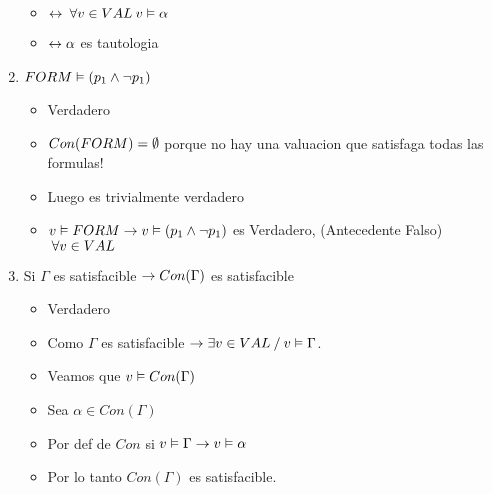 \documentclass[14pt,a4paper,fleqn]{article}
\begin{document}
\begin{enumerate}
\begin{itemize}
		\item $\leftrightarrow \: \forall v \in VAL  \: v \vDash \alpha$
		\item $\leftrightarrow \alpha $ es tautologia
	\end{itemize}
	\item $ FORM \vDash (p_{1} \wedge \neg p_{1})$
	\begin{itemize}
		\item Verdadero
		\item $Con(FORM) = \emptyset $ porque no hay una valuacion que satisfaga todas las formulas!
		\item Luego es trivialmente verdadero
		\item $v \vDash FORM \rightarrow v \vDash (p_1 \wedge \neg p_1) $ es Verdadero, (Antecedente Falso) $\: \forall v \in VAL $
	\end{itemize}
	\item Si $\Gamma$ es satisfacible $\rightarrow Con(\Gamma)$ es satisfacible
	\begin{itemize}
		\item Verdadero
		\item Como $\Gamma$ es satisfacible $\rightarrow \exists v \in VAL  \: / \: v \vDash \Gamma$. 
		\item Veamos que $v \vDash Con(\Gamma)$
		\item Sea $\alpha \in Con(\Gamma)$
		\item Por def de $Con$ si $v \vDash \Gamma \rightarrow v \vDash \alpha$
		\item Por lo tanto $Con(\Gamma)$	 es satisfacible.
	\end{itemize}
\end{enumerate}
\end{document}
